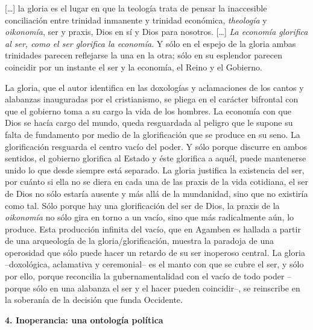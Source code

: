 {[}\ldots{]} la gloria es el lugar en que la teología trata de pensar la inaccesible conciliación entre trinidad inmanente y trinidad económica, \emph{theología }y \emph{oikonomía}, ser y praxis, Dios en sí y Dios para nosotros. {[}\ldots{]} \emph{La economía glorifica al ser, como el ser glorifica la economía}. Y sólo en el espejo de la gloria ambas trinidades parecen reflejarse la una en la otra; sólo en su esplendor parecen coincidir por un instante el ser y la economía, el Reino y el Gobierno.

La gloria, que el autor identifica en las doxologías y aclamaciones de los cantos y alabanzas inauguradas por el cristianismo, se pliega en el carácter bifrontal con que el gobierno toma a su cargo la vida de los hombres. La economía con que Dios se hacía cargo del mundo, queda resguardada al peligro que le supone su falta de fundamento por medio de la glorificación que se produce en su seno. La glorificación resguarda el centro vacío del poder. Y sólo porque discurre en ambos sentidos, el gobierno glorifica al Estado y éste glorifica a aquél, puede mantenerse unido lo que desde siempre está separado. La gloria justifica la existencia del ser, por cuánto si ella no se diera en cada una de las praxis de la vida cotidiana, el ser de Dios no sólo estaría ausente y más allá de la mundanidad, sino que no existiría como tal. Sólo porque hay una glorificación del ser de Dios, la praxis de la \emph{oikonomía }no sólo gira en torno a un vacío, sino que más radicalmente aún, lo produce. Esta producción infinita del vacío, que en Agamben es hallada a partir de una arqueología de la gloria/glorificación, muestra la paradoja de una operosidad que sólo puede hacer un retardo de su ser inoperoso central. La gloria --doxológica, aclamativa y ceremonial-- es el manto con que se cubre el ser, y sólo por ello, porque reconcilia la gubernamentalidad con el vacío de todo poder --porque sólo en una alabanza el ser y el hacer pueden coincidir--, se reinscribe en la soberanía de la decisión que funda Occidente.

\textbf{4. Inoperancia: una ontología política}

